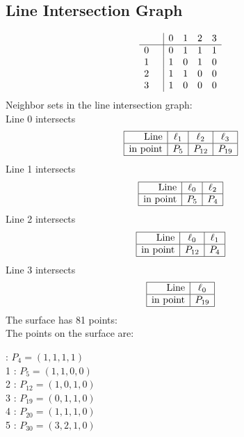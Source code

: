 \documentclass{article}
\begin{document}
{\subsection*{Line Intersection Graph}
{\arraycolsep=1pt
$$
\begin{array}{rr|*{4}r}
 &  & 0 & 1 & 2 & 3\\
\hline
0 &  & 0 & 1 & 1 & 1\\
1 &  & 1 & 0 & 1 & 0\\
2 &  & 1 & 1 & 0 & 0\\
3 &  & 1 & 0 & 0 & 0\\
\end{array}
$$
}%
Neighbor sets in the line intersection graph:\\
Line 0 intersects 
$$
\begin{array}{|r*{3}{|c}|}
\hline
\mbox{Line}  & \ell_{1} & \ell_{2} & \ell_{3}\\
\hline
\mbox{in point}  & P_{5} & P_{12} & P_{19}\\
\hline
\end{array}
$$
Line 1 intersects 
$$
\begin{array}{|r*{2}{|c}|}
\hline
\mbox{Line}  & \ell_{0} & \ell_{2}\\
\hline
\mbox{in point}  & P_{5} & P_{4}\\
\hline
\end{array}
$$
Line 2 intersects 
$$
\begin{array}{|r*{2}{|c}|}
\hline
\mbox{Line}  & \ell_{0} & \ell_{1}\\
\hline
\mbox{in point}  & P_{12} & P_{4}\\
\hline
\end{array}
$$
Line 3 intersects 
$$
\begin{array}{|r*{1}{|c}|}
\hline
\mbox{Line}  & \ell_{0}\\
\hline
\mbox{in point}  & P_{19}\\
\hline
\end{array}
$$
The surface has 81 points:\\
The points on the surface are:\\
\begin{multicols}{3}
 : $P_{4}=( 1, 1, 1, 1 )$\\
1 : $P_{5}=( 1, 1, 0, 0 )$\\
2 : $P_{12}=( 1, 0, 1, 0 )$\\
3 : $P_{19}=( 0, 1, 1, 0 )$\\
4 : $P_{20}=( 1, 1, 1, 0 )$\\
5 : $P_{30}=( 3, 2, 1, 0 )$\\

\end{multicols}}
\end{document}
